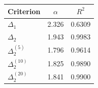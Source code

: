 \begin{tabular}{lcc}
\toprule
Criterion & $\alpha$ & $R^2$ \\
\midrule
$\Delta_1$ & 2.326 & 0.6309 \\
$\Delta_2$ & 1.943 & 0.9983 \\
$\Delta_2^{(5)}$ & 1.796 & 0.9614 \\
$\Delta_2^{(10)}$ & 1.825 & 0.9890 \\
$\Delta_2^{(20)}$ & 1.841 & 0.9900 \\
\bottomrule
\end{tabular}